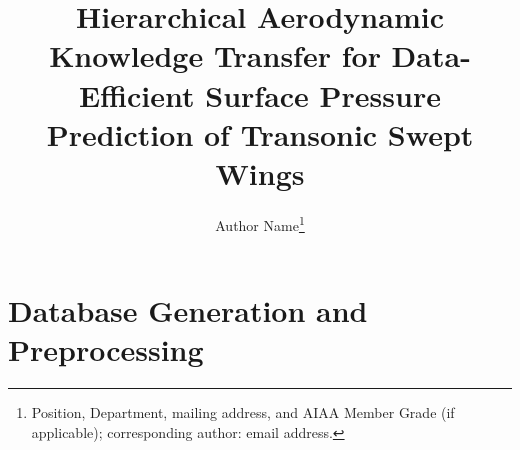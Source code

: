 \documentclass[journal]{new-aiaa}
\title{Hierarchical Aerodynamic Knowledge Transfer for Data-Efficient
Surface Pressure Prediction of Transonic Swept Wings}
\author{Author Name\footnote{Position, Department, mailing address, and AIAA
Member Grade (if applicable); corresponding author: email address.}}
\affil{Institution, City, Province or State, Postal Code, Country}
\begin{document}
\maketitle




% 








\section{Database Generation and Preprocessing}
\label{sec:database-generation}











\end{document}
